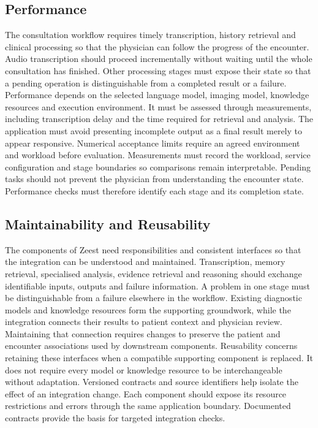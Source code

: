 \subsection{Performance}

The consultation workflow requires timely transcription, history retrieval and clinical processing so that the physician can follow the progress of the encounter. Audio transcription should proceed incrementally without waiting until the whole consultation has finished. Other processing stages must expose their state so that a pending operation is distinguishable from a completed result or a failure. Performance depends on the selected language model, imaging model, knowledge resources and execution environment. It must be assessed through measurements, including transcription delay and the time required for retrieval and analysis. The application must avoid presenting incomplete output as a final result merely to appear responsive. Numerical acceptance limits require an agreed environment and workload before evaluation. Measurements must record the workload, service configuration and stage boundaries so comparisons remain interpretable. Pending tasks should not prevent the physician from understanding the encounter state. Performance checks must therefore identify each stage and its completion state.

\subsection{Maintainability and Reusability}

The components of Zeest need responsibilities and consistent interfaces so that the integration can be understood and maintained. Transcription, memory retrieval, specialised analysis, evidence retrieval and reasoning should exchange identifiable inputs, outputs and failure information. A problem in one stage must be distinguishable from a failure elsewhere in the workflow. Existing diagnostic models and knowledge resources form the supporting groundwork, while the integration connects their results to patient context and physician review. Maintaining that connection requires changes to preserve the patient and encounter associations used by downstream components. Reusability concerns retaining these interfaces when a compatible supporting component is replaced. It does not require every model or knowledge resource to be interchangeable without adaptation. Versioned contracts and source identifiers help isolate the effect of an integration change. Each component should expose its resource restrictions and errors through the same application boundary. Documented contracts provide the basis for targeted integration checks.


